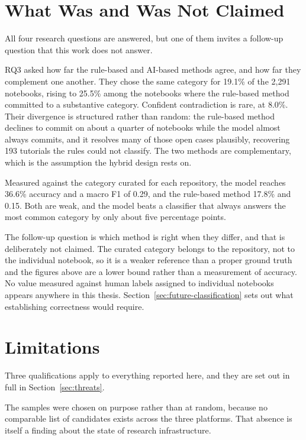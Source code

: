 \section{What Was and Was Not Claimed}

All four research questions are answered, but one of them invites a follow-up question that this work does not answer.

RQ3 asked how far the rule-based and AI-based methods agree, and how far they complement one another. They chose the same category for 19.1\% of the 2{,}291 notebooks, rising to 25.5\% among the notebooks where the rule-based method committed to a substantive category. Confident contradiction is rare, at 8.0\%. Their divergence is structured rather than random: the rule-based method declines to commit on about a quarter of notebooks while the model almost always commits, and it resolves many of those open cases plausibly, recovering 193 tutorials the rules could not classify. The two methods are complementary, which is the assumption the hybrid design rests on.

Measured against the category curated for each repository, the model reaches 36.6\% accuracy and a macro F1 of 0.29, and the rule-based method 17.8\% and 0.15. Both are weak, and the model beats a classifier that always answers the most common category by only about five percentage points.

The follow-up question is which method is right when they differ, and that is deliberately not claimed. The curated category belongs to the repository, not to the individual notebook, so it is a weaker reference than a proper ground truth and the figures above are a lower bound rather than a measurement of accuracy. No value measured against human labels assigned to individual notebooks appears anywhere in this thesis. Section~\ref{sec:future-classification} sets out what establishing correctness would require.

\section{Limitations}

Three qualifications apply to everything reported here, and they are set out in full in Section~\ref{sec:threats}.

The samples were chosen on purpose rather than at random, because no comparable list of candidates exists across the three platforms. That absence is itself a finding about the state of research infrastructure.


